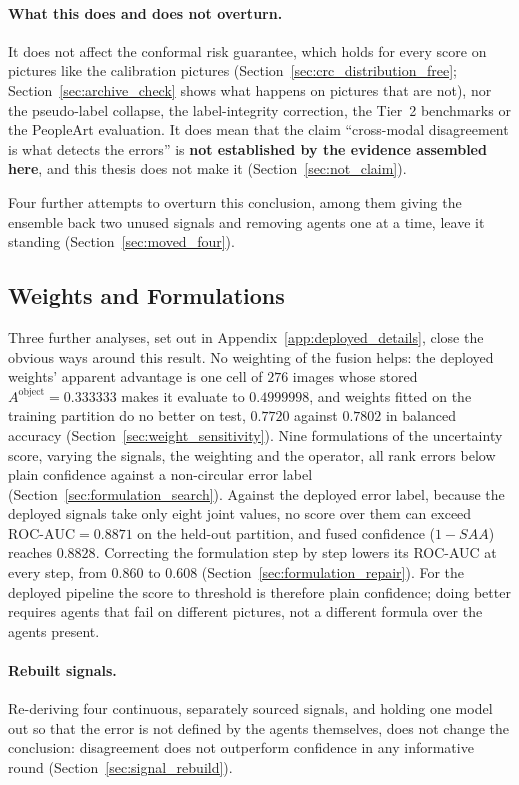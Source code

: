 \documentclass[12pt,a4paper]{report}
\begin{document}
\paragraph{What this does and does not overturn.} It does not affect the conformal risk guarantee, which holds for every score on pictures like the calibration pictures (Section~\ref{sec:crc_distribution_free}; Section~\ref{sec:archive_check} shows what happens on pictures that are not), nor the pseudo-label collapse, the label-integrity correction, the Tier~2 benchmarks or the PeopleArt evaluation. It does mean that the claim ``cross-modal disagreement is what detects the errors'' is \textbf{not established by the evidence assembled here}, and this thesis does not make it (Section~\ref{sec:not_claim}).

Four further attempts to overturn this conclusion, among them giving the ensemble back two unused signals and removing agents one at a time, leave it standing (Section~\ref{sec:moved_four}).

\subsection{Weights and Formulations}
Three further analyses, set out in Appendix~\ref{app:deployed_details}, close the obvious ways around this result. No weighting of the fusion helps: the deployed weights' apparent advantage is one cell of $276$ images whose stored $A^{\text{object}} = 0.333333$ makes it evaluate to $0.4999998$, and weights fitted on the training partition do no better on test, $0.7720$ against $0.7802$ in balanced accuracy (Section~\ref{sec:weight_sensitivity}). Nine formulations of the uncertainty score, varying the signals, the weighting and the operator, all rank errors below plain confidence against a non-circular error label (Section~\ref{sec:formulation_search}). Against the deployed error label, because the deployed signals take only eight joint values, no score over them can exceed $\text{ROC-AUC} = 0.8871$ on the held-out partition, and fused confidence ($1 - SAA$) reaches $0.8828$. Correcting the formulation step by step lowers its ROC-AUC at every step, from $0.860$ to $0.608$ (Section~\ref{sec:formulation_repair}). For the deployed pipeline the score to threshold is therefore plain confidence; doing better requires agents that fail on different pictures, not a different formula over the agents present.

\paragraph{Rebuilt signals.} Re-deriving four continuous, separately sourced signals, and holding one model out so that the error is not defined by the agents themselves, does not change the conclusion: disagreement does not outperform confidence in any informative round (Section~\ref{sec:signal_rebuild}).
\end{document}
